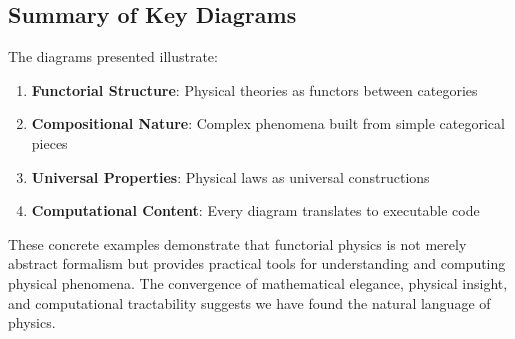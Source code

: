 \subsection{Summary of Key Diagrams}

The diagrams presented illustrate:

\begin{enumerate}[leftmargin=*]
\item \textbf{Functorial Structure}: Physical theories as functors between categories
\item \textbf{Compositional Nature}: Complex phenomena built from simple categorical pieces
\item \textbf{Universal Properties}: Physical laws as universal constructions
\item \textbf{Computational Content}: Every diagram translates to executable code
\end{enumerate}

These concrete examples demonstrate that functorial physics is not merely abstract formalism but provides practical tools for understanding and computing physical phenomena. The convergence of mathematical elegance, physical insight, and computational tractability suggests we have found the natural language of physics.